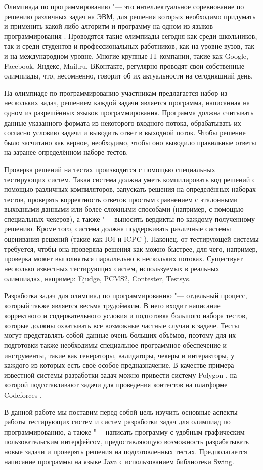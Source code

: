 Олимпиада по программированию "--- это интеллектуальное соревнование по решению различных задач на ЭВМ, для решения которых необходимо придумать и применить какой-либо алгоритм и программу на одном из языков программирования \cite{wiki}. Проводятся такие олимпиады сегодня как среди школьников, так и среди студентов и профессиональных работников, как на уровне вузов, так и на международном уровне. Многие крупные IT-компании, такие как Google, Facebook, Яндекс, Mail.ru, ВКонтакте, регулярно проводят свои собственные олимпиады, что, несомненно, говорит об их актуальности на сегодняшний день.

На олимпиаде по программированию участникам предлагается набор из нескольких задач, решением каждой задачи является программа, написанная на одном из разрешённых языков программирования. Программа должна считывать данные указанного формата из некоторого входного потока, обрабатывать их согласно условию задачи и выводить ответ в выходной поток. Чтобы решение было засчитано как верное, необходимо, чтобы оно выводило правильные ответы на заранее определённом наборе тестов.

Проверка решений на тестах производится с помощью специальных тестирующих систем. Такая система должна уметь компилировать код решений с помощью различных компиляторов, запускать решения на определённых наборах тестов, проверять корректность ответов простым сравнением с эталонными выходными данными или более сложными способами (например, с помощью специальных чекеров), а также "--- выносить вердикты по каждому полученному решению. Кроме того, система должна поддерживать различные системы оценивания решений (такие как IOI и ICPC \cite{wiki}). Наконец, от тестирующей системы требуется, чтобы она проверяла решения как можно быстрее, для чего, например, проверка может выполняться параллельно в нескольких потоках. Существует несколько известных тестирующих систем, используемых в реальных олимпиадах, например: Ejudge, PCMS2, Contester, Testsys.

Разработка задач для олимпиад по программированию "--- отдельный процесс, который также является весьма трудоёмким. В него входит написание корректного и содержательного условия и подготовка большого набора тестов, которые должны охватывать все возможные частные случаи в задаче. Тесты могут представлять собой данные очень больших объёмов, поэтому для их подготовки также необходимы специальное программное обеспечение и инструменты, такие как генераторы, валидаторы, чекеры и интеракторы, у каждого из которых есть своё особое предназначение. В качестве примера известной системы разработки задач можно привести систему Polygon \cite{polygon}, на которой подготавливают задачи для проведения контестов на платформе Codeforces \cite{codeforces}.

В данной работе мы поставим перед собой цель изучить основные аспекты работы тестирующих систем и систем разработки задач для олимпиад по программированию, а также "--- написать программу с удобным графическим пользовательским интерфейсом, предоставляющую возможность разрабатывать новые задачи и проверять решения на подготовленных тестах. Предполагается написание программы на языке Java с использованием библиотеки Swing.